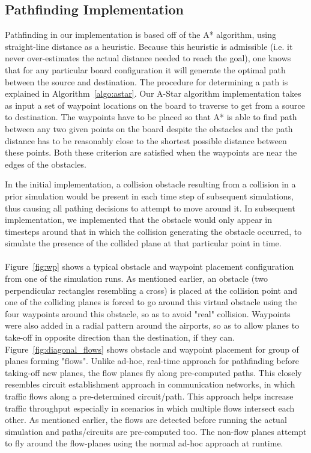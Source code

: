 \documentclass[10pt]{article}
\begin{document}
\subsection{Pathfinding Implementation}
Pathfinding in our implementation is based off of the A* algorithm, using
straight-line distance as a heuristic. Because this heuristic is admissible
(i.e. it never over-estimates the actual distance needed to reach the goal), one
knows that for any particular board configuration it will generate the optimal
path between the source and destination. The procedure for determining a path is
explained in Algorithm~\ref{algo:astar}. Our A-Star algorithm implementation
takes as input a set of waypoint locations on the board to traverse to get from
a source to destination.  The waypoints have to be placed so that A* is able to
find path between any two given points on the board despite the obstacles and
the path distance has to be reasonably close to the shortest possible distance
between these points.  Both these criterion are satisfied when the waypoints are
near the edges of the obstacles. 

In the initial implementation, a collision obstacle resulting from a collision
in a prior simulation would be present in each time step of subsequent
simulations, thus causing all pathing decisions to attempt to move around it. In
subsequent implementation, we implemented that the obstacle would only appear in
timesteps around that in which the collision generating the obstacle occurred,
to simulate the presence of the collided plane at that particular point in
time.\\\\

Figure~\ref{fig:wp} shows a typical obstacle and waypoint placement
configuration from one of the simulation runs. As mentioned earlier, an obstacle
(two perpendicular rectangles resembling a cross) is placed at the collision
point and one of the colliding planes is forced to go around this virtual
obstacle using the four waypoints around this obstacle, so as to avoid "real"
collision. Waypoints were also added in a radial pattern around the airports, so
as to allow planes to take-off in opposite direction than the destination, if
they can. Figure~\ref{fig:diagonal_flows} shows obstacle and waypoint placement
for group of planes forming "flows". Unlike ad-hoc, real-time approach for
pathfinding before taking-off new planes, the flow planes fly along pre-computed
paths. This closely resembles circuit establishment approach in communication
networks, in which traffic flows along a pre-determined circuit/path. This
approach helps increase traffic throughput especially in scenarios in which
multiple flows intersect each other. As mentioned earlier, the flows are
detected before running the actual simulation and paths/circuits are
pre-computed too. The non-flow planes attempt to fly around the flow-planes
using the normal ad-hoc approach at runtime.
\end{document}
